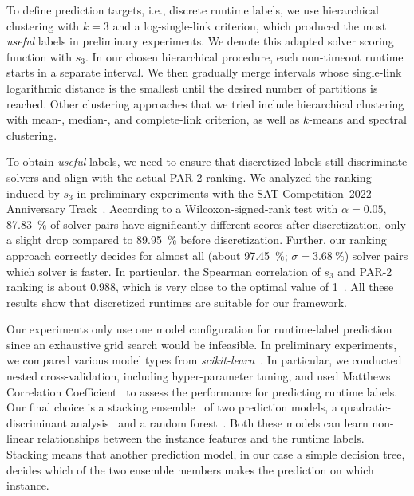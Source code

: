 \documentclass[sn-basic, Numbered]{sn-jnl} %
\begin{document}
To define prediction targets, i.e., discrete runtime labels, we use hierarchical clustering with $k = 3$ and a log-single-link criterion, which produced the most \emph{useful} labels in preliminary experiments.
We denote this adapted solver scoring function with $s_3$.
In our chosen hierarchical procedure, each non-timeout runtime starts in a separate interval.
We then gradually merge intervals whose single-link logarithmic distance is the smallest until the desired number of partitions is reached.
Other clustering approaches that we tried include hierarchical clustering with mean-, median-, and complete-link criterion, as well as $k$-means and spectral clustering.

To obtain \emph{useful} labels, we need to ensure that discretized labels still discriminate solvers and align with the actual PAR-2 ranking.
We analyzed the ranking induced by $s_3$ in preliminary experiments with the SAT Competition~2022 Anniversary Track~\cite{sat2022}.
According to a Wilcoxon-signed-rank test with $\alpha = 0.05$, \SI{87.83}{\%} of solver pairs have significantly different scores after discretization, only a slight drop compared to \SI{89.95}{\%} before discretization.
Further, our ranking approach correctly decides for almost all (about \SI{97.45}{\%}; $\sigma = \SI{3.68}{\%}$) solver pairs which solver is faster.
In particular, the Spearman correlation of $s_3$ and PAR-2 ranking is about \SI{0.988}{}, which is very close to the optimal value of 1~\cite{de2016comparing}.
All these results show that discretized runtimes are suitable for our framework.


Our experiments only use one model configuration for runtime-label prediction since an exhaustive grid search would be infeasible.
In preliminary experiments, we compared various model types from \emph{scikit-learn}~\cite{scikit-learn}.
In particular, we conducted nested cross-validation, including hyper-parameter tuning, and used Matthews Correlation Coefficient~\cite{gorodkin2004comparing,matthews1975comparison} to assess the performance for predicting runtime labels.
Our final choice is a stacking ensemble~\cite{wolpert1992stacked} of two prediction models, a quadratic-discriminant analysis~\cite{tharwat2016linear} and a random forest~\cite{breiman2001random}.
Both these models can learn non-linear relationships between the instance features and the runtime labels.
Stacking means that another prediction model, in our case a simple decision tree, decides which of the two ensemble members makes the prediction on which instance.
\end{document}

